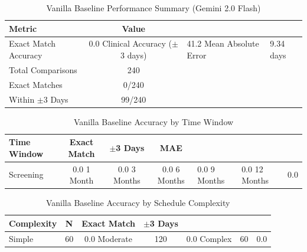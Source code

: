 
\begin{table}[htbp]
\centering
\caption{Vanilla Baseline Performance Summary (Gemini 2.0 Flash)}
\label{tab:vanilla_baseline_summary}
\begin{tabular}{lc}
\toprule
\textbf{Metric} & \textbf{Value} \\
\midrule
Exact Match Accuracy & 0.0%
Clinical Accuracy ($\pm$3 days) & 41.2%
Mean Absolute Error & 9.34 days \\
Total Comparisons & 240 \\
Exact Matches & 0/240 \\
Within $\pm$3 Days & 99/240 \\
\bottomrule
\end{tabular}
\end{table}

\begin{table}[htbp]
\centering
\caption{Vanilla Baseline Accuracy by Time Window}
\label{tab:vanilla_baseline_windows}
\begin{tabular}{lccc}
\toprule
\textbf{Time Window} & \textbf{Exact Match} & \textbf{$\pm$3 Days} & \textbf{MAE} \\
\midrule
Screening & 0.0%
1 Month & 0.0%
3 Months & 0.0%
6 Months & 0.0%
9 Months & 0.0%
12 Months & 0.0%
\bottomrule
\end{tabular}
\end{table}

\begin{table}[htbp]
\centering
\caption{Vanilla Baseline Accuracy by Schedule Complexity}
\label{tab:vanilla_baseline_complexity}
\begin{tabular}{lccc}
\toprule
\textbf{Complexity} & \textbf{N} & \textbf{Exact Match} & \textbf{$\pm$3 Days} \\
\midrule
Simple & 60 & 0.0%
Moderate & 120 & 0.0%
Complex & 60 & 0.0%
\bottomrule
\end{tabular}
\end{table}

